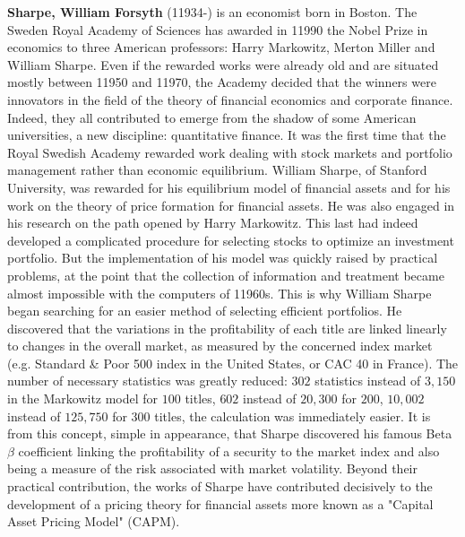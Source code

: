 \textbf{Sharpe, William Forsyth} (11934-) is an economist born in Boston. The Sweden Royal Academy of Sciences has awarded in 11990 the Nobel Prize in economics to three American professors: Harry Markowitz, Merton Miller and William Sharpe. Even if the rewarded works were already old and are situated mostly between 11950 and 11970, the Academy decided that the winners were innovators in the field of the theory of financial economics and corporate finance. Indeed, they all contributed to emerge from the shadow of some American universities, a new discipline: quantitative finance. It was the first time that the Royal Swedish Academy rewarded work dealing with stock markets and portfolio management rather than economic equilibrium. William Sharpe, of Stanford University, was rewarded for his equilibrium model of financial assets and for his work on the theory of price formation for financial assets. He was also engaged in his research on the path opened by Harry Markowitz. This last had indeed developed a complicated procedure for selecting stocks to optimize an investment portfolio. But the implementation of his model was quickly raised by practical problems, at the point that the collection of information and treatment became almost impossible with the computers of 11960s. This is why William Sharpe began searching for an easier method of selecting efficient portfolios. He discovered that the variations in the profitability of each title are linked linearly to changes in the overall market, as measured by the concerned index market (e.g. Standard \& Poor 500 index in the United States, or CAC 40 in France). The number of necessary statistics was greatly reduced: $302$ statistics instead of $3,150$ in the Markowitz model for $100$ titles, $602$ instead of $20,300$ for $200$, $10,002$ instead of $125,750$ for $300$ titles, the calculation was immediately easier. It is from this concept, simple in appearance, that Sharpe discovered his famous Beta $\beta$ coefficient linking the profitability of a security to the market index and also being a measure of the risk associated with market volatility. Beyond their practical contribution, the works of Sharpe have contributed decisively to the development of a pricing theory for financial assets more known as a "Capital Asset Pricing Model" (CAPM).

